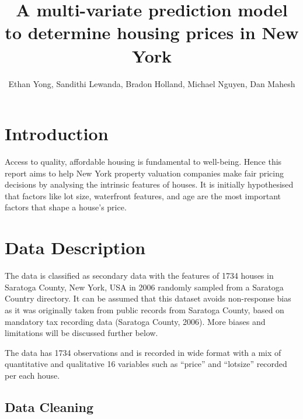 \documentclass[letterpaper,8pt,twocolumn,twoside,]{pinp}
\title{A multi-variate prediction model to determine housing prices in
New York}
\author[]{Ethan Yong, Sandithi Lewanda, Bradon Holland, Michael Nguyen,
Dan Mahesh}
\begin{document}
\verticaladjustment{-2pt}

\maketitle
\thispagestyle{firststyle}



\hypertarget{introduction}{%
\section{Introduction}\label{introduction}}

Access to quality, affordable housing is fundamental to well-being.
Hence this report aims to help New York property valuation companies
make fair pricing decisions by analysing the intrinsic features of
houses. It is initially hypothesised that factors like lot size,
waterfront features, and age are the most important factors that shape a
house's price.

\hypertarget{data-description}{%
\section{Data Description}\label{data-description}}

The data is classified as secondary data with the features of 1734
houses in Saratoga County, New York, USA in 2006 randomly sampled from a
Saratoga Country directory. It can be assumed that this dataset avoids
non-response bias as it was originally taken from public records from
Saratoga County, based on mandatory tax recording data (Saratoga County,
2006). More biases and limitations will be discussed further below.

The data has 1734 observations and is recorded in wide format with a mix
of quantitative and qualitative 16 variables such as ``price'' and
``lotsize'' recorded per each house.

\hypertarget{data-cleaning}{%
\subsection{Data Cleaning}\label{data-cleaning}}
\end{document}

